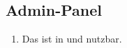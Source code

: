 \subsection{Admin-Panel}

\begin{enumerate}
    \item Das %
        ist in %
        und %
        nutzbar.
\end{enumerate}